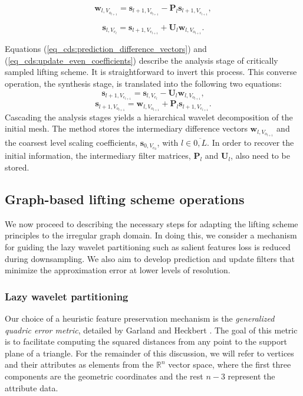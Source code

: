 \documentclass[graybox]{svmult}
\begin{document}
\begin{equation}
\mathbf{w}_{l,V_{o_{l+1}}} = \mathbf{s}_{l+1,V_{o_{l+1}}} - \mathbf{P}_l \mathbf{s}_{l+1,V_{e_{l+1}}},
\label{eq_cds:prediction_difference_vectors} 
\end{equation}

\begin{equation}
\mathbf{s}_{l,V_{e_l}} = \mathbf{s}_{l+1,V_{e_{l+1}}} + \mathbf{U}_l \mathbf{w}_{l,V_{o_{l+1}}}.
\label{eq_cds:update_even_coefficients}
\end{equation}

Equations (\ref{eq_cds:prediction_difference_vectors}) and (\ref{eq_cds:update_even_coefficients}) describe the analysis stage of critically sampled lifting scheme. It is straightforward
to invert this process. This converse operation, the synthesis stage, is translated into the following two equations:
\begin{equation}
\mathbf{s}_{l+1,V_{e_{l+1}}} = \mathbf{s}_{l,V_{e_l}} - \mathbf{U}_l \mathbf{w}_{l,V_{o_{l+1}}},
\label{eq_cds:synthesis_odd}
\end{equation}
\begin{equation}
\mathbf{s}_{l+1,V_{o_{l+1}}} = \mathbf{w}_{l,V_{o_{l+1}}} + \mathbf{P}_l \mathbf{s}_{l+1,V_{e_{l+1}}}.
\label{eq_cds:synthesis_even}
\end{equation}
Cascading the analysis stages yields a hierarchical wavelet decomposition of the initial mesh. The method stores the intermediary difference vectors $\mathbf{w}_{l,V_{o_{l+1}}}$ and the 
coarsest level scaling coefficients, $\mathbf{s}_{0, V_{e_0}}$, with $l \in \overline{0,L}$. In order to recover the initial information, the intermediary filter matrices, $\mathbf{P}_l$ and
$\mathbf{U}_l$, also need to be stored.

\subsection{Graph-based lifting scheme operations}
We now proceed to describing the necessary steps for adapting the lifting scheme principles to the irregular graph domain. In doing this, we consider a mechanism for guiding the lazy wavelet partitioning such as salient features loss is reduced during downsampling. We also aim to develop prediction and update filters that minimize the approximation error at lower levels of resolution.

\subsubsection{Lazy wavelet partitioning}
Our choice of a heuristic feature preservation mechanism is the
 \emph{generalized quadric error metric}, detailed by Garland and Heckbert \cite{Garland1998}. The goal of this metric is to facilitate computing the squared distances from any point to the support plane of a triangle. For the remainder of this discussion, we will refer to vertices and their attributes as elements from the $\mathbb{R}^n$ vector space, where the first three components are the geometric coordinates and the rest $n-3$ represent the attribute data.
\end{document}
